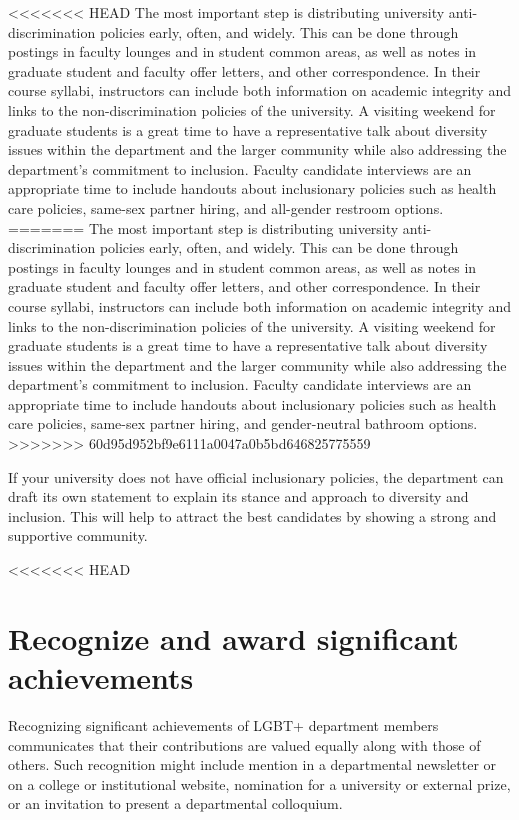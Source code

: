 <<<<<<< HEAD
The most important step is distributing university anti-discrimination policies early, often, and widely. This can be done through postings in faculty lounges and in student common areas, as well as notes in graduate student and faculty offer letters, and other correspondence. In their course syllabi, instructors can include both information on academic integrity and links to the non-discrimination policies of the university. A visiting weekend for graduate students is a great time to have a representative talk about diversity issues within the department and the larger community while also addressing the department's commitment to inclusion. Faculty candidate interviews are an appropriate time to include handouts about inclusionary policies such as health care policies, same-sex partner hiring, and all-gender restroom options.
=======
The most important step is distributing university anti-discrimination policies early, often, and widely. This can be done through postings in faculty lounges and in student common areas, as well as notes in graduate student and faculty offer letters, and other correspondence. In their course syllabi, instructors can include both information on academic integrity and links to the non-discrimination policies of the university. A visiting weekend for graduate students is a great time to have a representative talk about diversity issues within the department and the larger community while also addressing the department's commitment to inclusion. Faculty candidate interviews are an appropriate time to include handouts about inclusionary policies such as health care policies, same-sex partner hiring, and gender-neutral bathroom options.
>>>>>>> 60d95d952bf9e6111a0047a0b5bd646825775559

If your university does not have official inclusionary policies, the department can draft its own statement to explain its stance and approach to diversity and inclusion. This will help to attract the best candidates by showing a strong and supportive community.


<<<<<<< HEAD
\section {Recognize and award significant achievements}
\label{recognize-achievements}
Recognizing significant achievements of LGBT+ department members communicates that their contributions are valued equally along with those of others. Such recognition might include mention in a departmental newsletter or on a college or institutional website, nomination for a university or external prize, or an invitation to present a departmental colloquium.

